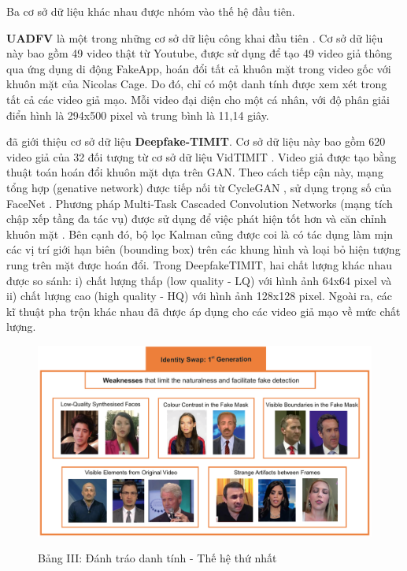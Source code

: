 \documentclass{article}
\begin{document}
Ba cơ sở dữ liệu khác nhau được nhóm vào thế hệ đầu tiên.

\textbf{UADFV} là một trong những cơ sở dữ liệu công khai đầu tiên . Cơ sở dữ liệu này bao gồm 49 video thật từ Youtube, được sử dụng để tạo 49 video giả thông qua ứng dụng di động FakeApp, hoán đổi tất cả khuôn mặt trong video gốc với khuôn mặt của Nicolas Cage. Do đó, chỉ có một danh tính được xem xét trong tất cả các video giả mạo. Mỗi video đại diện cho một cá nhân, với độ phân giải điển hình là 294x500 pixel và trung bình là 11,14 giây.

 đã giới thiệu cơ sở dữ liệu \textbf{Deepfake-TIMIT}. Cơ sở dữ liệu này bao gồm 620 video giả của 32 đối tượng từ cơ sở dữ liệu VidTIMIT . Video giả được tạo bằng thuật toán hoán đổi khuôn mặt dựa trên GAN. Theo cách tiếp cận này, mạng tổng hợp (genative network) được tiếp nối từ CycleGAN , sử dụng trọng số của FaceNet . Phương pháp Multi-Task Cascaded Convolution Networks (mạng tích chập xếp tầng đa tác vụ) được sử dụng để việc phát hiện tốt hơn và căn chỉnh khuôn mặt . Bên cạnh đó, bộ lọc Kalman cũng được coi là có tác dụng làm mịn các vị trí giới hạn biên (bounding box) trên các khung hình và loại bỏ hiện tượng rung trên mặt được hoán đổi. Trong DeepfakeTIMIT, hai chất lượng khác nhau được so sánh: i) chất lượng thấp (low quality - LQ) với hình ảnh 64x64 pixel và ii) chất lượng cao (high quality - HQ) với hình ảnh 128x128 pixel. Ngoài ra, các kĩ thuật pha trộn khác nhau đã được áp dụng cho các video giả mạo về mức chất lượng.

\begin{figure}[h!]
\caption{Bảng III: Đánh tráo danh tính - Thế hệ thứ nhất}
\includegraphics[width=\columnwidth]{fig-3-id-swap-gen1}
\label{fig-3-id-swap-gen1}
\end{figure}
\end{document}
